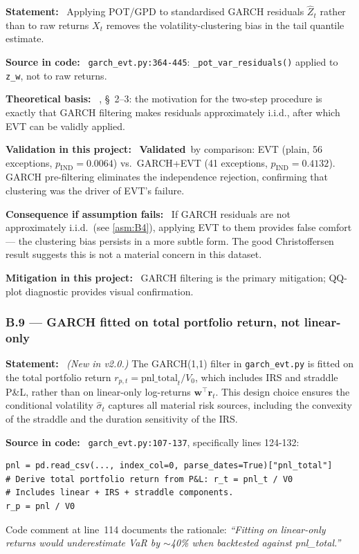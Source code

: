 \documentclass[11pt,a4paper]{article}
\newcommand{\asmfield}[1]{\medskip\noindent\textbf{#1:}\ }
\newcommand{\code}[1]{\texttt{#1}}
\newcommand{\validated}{\textbf{Validated}}
\begin{document}
\asmfield{Statement}
Applying POT/GPD to standardised GARCH residuals $\hat{Z}_t$ rather than
to raw returns $X_t$ removes the volatility-clustering bias in the tail
quantile estimate.

\asmfield{Source in code}
\code{garch\_evt.py:364-445}: \code{\_pot\_var\_residuals()} applied to
\code{z\_w}, not to raw returns.

\asmfield{Theoretical basis}
\cite{McNeilFrey2000}, \S~2--3: the motivation for the two-step procedure
is exactly that GARCH filtering makes residuals approximately i.i.d., after
which EVT can be validly applied.

\asmfield{Validation in this project}
\validated\ by comparison: EVT (plain, 56 exceptions, $p_{\mathrm{IND}} =
0.0064$) vs.\ GARCH+EVT (41 exceptions, $p_{\mathrm{IND}} = 0.4132$).
GARCH pre-filtering eliminates the independence rejection, confirming that
clustering was the driver of EVT's failure.

\asmfield{Consequence if assumption fails}
If GARCH residuals are not approximately i.i.d.\ (see \cref{asm:B4}),
applying EVT to them provides false comfort --- the clustering bias
persists in a more subtle form. The good Christoffersen result suggests
this is not a material concern in this dataset.

\asmfield{Mitigation in this project}
GARCH filtering is the primary mitigation; QQ-plot diagnostic provides
visual confirmation.

\subsubsection{B.9 --- GARCH fitted on total portfolio return, not linear-only}\label{asm:B9}

\asmfield{Statement}
\emph{(New in v2.0.)} The GARCH(1,1) filter in \code{garch\_evt.py} is
fitted on the total portfolio return $r_{p,t} = \text{pnl\_total}_t / V_0$,
which includes IRS and straddle P\&L, rather than on linear-only
log-returns $\mathbf{w}^{\top} \mathbf{r}_t$.  This design choice ensures
the conditional volatility $\hat{\sigma}_t$ captures all material risk
sources, including the convexity of the straddle and the duration
sensitivity of the IRS.

\asmfield{Source in code}
\code{garch\_evt.py:107-137}, specifically lines 124-132:
\begin{lstlisting}
pnl = pd.read_csv(..., index_col=0, parse_dates=True)["pnl_total"]
# Derive total portfolio return from P&L: r_t = pnl_t / V0
# Includes linear + IRS + straddle components.
r_p = pnl / V0
\end{lstlisting}
Code comment at line~114 documents the rationale: \emph{``Fitting on
linear-only returns would underestimate VaR by $\sim$40\% when backtested
against pnl\_total.''}
\end{document}

